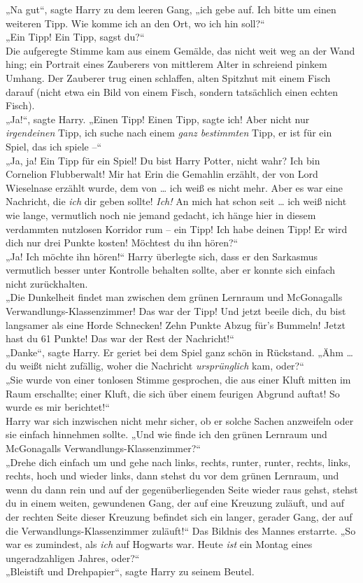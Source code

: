 {„Na gut“, sagte Harry zu dem leeren Gang, „ich gebe auf. Ich bitte um einen weiteren Tipp. Wie komme ich an den Ort, wo ich hin soll?“\\ „Ein Tipp! Ein Tipp, sagst du?“\\ Die aufgeregte Stimme kam aus einem Gemälde, das nicht weit weg an der Wand hing; ein Portrait eines Zauberers von mittlerem Alter in schreiend pinkem Umhang. Der Zauberer trug einen schlaffen, alten Spitzhut mit einem Fisch darauf (nicht etwa ein Bild von einem Fisch, sondern tatsächlich einen echten Fisch).\\ „Ja!“, sagte Harry. „Einen Tipp! Einen Tipp, sagte ich! Aber nicht nur \emph{irgendeinen} Tipp, ich suche nach einem \emph{ganz bestimmten} Tipp, er ist für ein Spiel, das ich spiele --“\\ „Ja, ja! Ein Tipp für ein Spiel! Du bist Harry Potter, nicht wahr? Ich bin Cornelion Flubberwalt! Mir hat Erin die Gemahlin erzählt, der von Lord Wieselnase erzählt wurde, dem von … ich weiß es nicht mehr. Aber es war eine Nachricht, die \emph{ich} dir geben sollte! \emph{Ich!} An mich hat schon seit … ich weiß nicht wie lange, vermutlich noch nie jemand gedacht, ich hänge hier in diesem verdammten nutzlosen Korridor rum -- ein Tipp! Ich habe deinen Tipp! Er wird dich nur drei Punkte kosten! Möchtest du ihn hören?“\\ „Ja! Ich möchte ihn hören!“ Harry überlegte sich, dass er den Sarkasmus vermutlich besser unter Kontrolle behalten sollte, aber er konnte sich einfach nicht zurückhalten.\\ „Die Dunkelheit findet man zwischen dem grünen Lernraum und McGonagalls Verwandlungs-Klassenzimmer! Das war der Tipp! Und jetzt beeile dich, du bist langsamer als eine Horde Schnecken! Zehn Punkte Abzug für's Bummeln! Jetzt hast du 61 Punkte! Das war der Rest der Nachricht!“\\ „Danke“, sagte Harry. Er geriet bei dem Spiel ganz schön in Rückstand. „Ähm … du weißt nicht zufällig, woher die Nachricht \emph{ursprünglich} kam, oder?“\\ „Sie wurde von einer tonlosen Stimme gesprochen, die aus einer Kluft mitten im Raum erschallte; einer Kluft, die sich über einem feurigen Abgrund auftat! So wurde es mir berichtet!“\\ Harry war sich inzwischen nicht mehr sicher, ob er solche Sachen anzweifeln oder sie einfach hinnehmen sollte. „Und wie finde ich den grünen Lernraum und McGonagalls Verwandlungs-Klassenzimmer?“\\ „Drehe dich einfach um und gehe nach links, rechts, runter, runter, rechts, links, rechts, hoch und wieder links, dann stehst du vor dem grünen Lernraum, und wenn du dann rein und auf der gegenüberliegenden Seite wieder raus gehst, stehst du in einem weiten, gewundenen Gang, der auf eine Kreuzung zuläuft, und auf der rechten Seite dieser Kreuzung befindet sich ein langer, gerader Gang, der auf die Verwandlungs-Klassenzimmer zuläuft!“ Das Bildnis des Mannes erstarrte. „So war es zumindest, als \emph{ich} auf Hogwarts war. Heute \emph{ist} ein Montag eines ungeradzahligen Jahres, oder?“\\ „Bleistift und Drehpapier“, sagte Harry zu seinem Beutel. }
